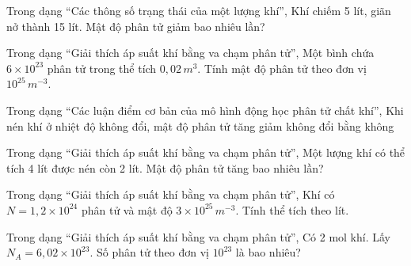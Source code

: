 \begin{ex}
Trong dạng “Các thông số trạng thái của một lượng khí”, Khí chiếm 5 lít, giãn nở thành 15 lít. Mật độ phân tử giảm bao nhiêu lần?
\end{ex}

\begin{ex}
Trong dạng “Giải thích áp suất khí bằng va chạm phân tử”, Một bình chứa $6\times10^{23}$ phân tử trong thể tích $0,02\,m^3$. Tính mật độ phân tử theo đơn vị $10^{25}\,m^{-3}$.
\end{ex}

\begin{ex}
Trong dạng “Các luận điểm cơ bản của mô hình động học phân tử chất khí”, Khi nén khí ở nhiệt độ không đổi, mật độ phân tử
\choice
{\True tăng}
{giảm}
{không đổi}
{bằng không}
\end{ex}

\begin{ex}
Trong dạng “Giải thích áp suất khí bằng va chạm phân tử”, Một lượng khí có thể tích 4 lít được nén còn 2 lít. Mật độ phân tử tăng bao nhiêu lần?
\end{ex}

\begin{ex}
Trong dạng “Giải thích áp suất khí bằng va chạm phân tử”, Khí có $N=1,2\times10^{24}$ phân tử và mật độ $3\times10^{25}\,m^{-3}$. Tính thể tích theo lít.
\end{ex}

\begin{ex}
Trong dạng “Giải thích áp suất khí bằng va chạm phân tử”, Có 2 mol khí. Lấy $N_A=6,02\times10^{23}$. Số phân tử theo đơn vị $10^{23}$ là bao nhiêu?
\end{ex}

